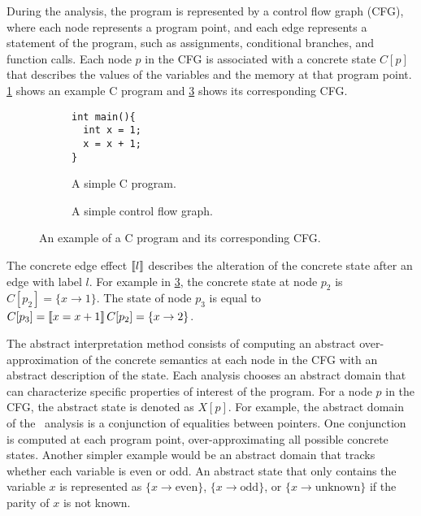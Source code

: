 During the analysis, the program is represented by a control flow graph (CFG), where each node represents a program point, and each edge represents a statement of the program,
such as assignments, conditional branches, and function calls.
Each node $p$ in the CFG is associated with a concrete state $C[p]$ that describes the values of the variables and the memory at that program point.
\cref{fig:example-C-program} shows an example C program and \cref{fig:example-CFG} shows its corresponding CFG.

\begin{figure}\begin{subfigure}{0.45\textwidth}
\centering
    \begin{verbatim}
int main(){
  int x = 1;
  x = x + 1;
}
\end{verbatim}
    \caption{A simple C program.}\label{fig:example-C-program}
  \end{subfigure}
  \begin{subfigure}{0.45\textwidth}
    \centering
    \caption{A simple control flow graph.}\label{fig:example-CFG}
  \end{subfigure}

  \caption[An example of a control flow graph.]{An example of a C program and its corresponding CFG.}


\end{figure}

The concrete edge effect $\llbracket l\rrbracket$ describes the alteration of the concrete state after an edge with label $l$.
For example in \cref{fig:example-CFG}, the concrete state at node $p_2$ is $C[p_2] = \{x \rightarrow 1\}$.
The state of node $p_3$ is equal to $C[p_3] = \llbracket x = x+1\rrbracket\,C[p_2] = \{x \rightarrow 2\}$.

The abstract interpretation method consists of computing an abstract over-approximation of the concrete semantics at each node in the CFG with an abstract description of the state.
Each analysis chooses an abstract domain that can characterize specific properties of interest of the program.
For a node $p$ in the CFG, the abstract state is denoted as $X[p]$.
For example, the abstract domain of the \cpo\ analysis is a conjunction of equalities between pointers.
One conjunction is computed at each program point, over-approximating all possible concrete states.
Another simpler example would be an abstract domain that tracks whether each variable is even or odd.
An abstract state that only contains the variable $x$ is represented as $\{x \rightarrow \text{even}\}$, $\{x \rightarrow \text{odd}\}$,  or $\{x \rightarrow \text{unknown}\}$ if the parity of $x$ is not known.

